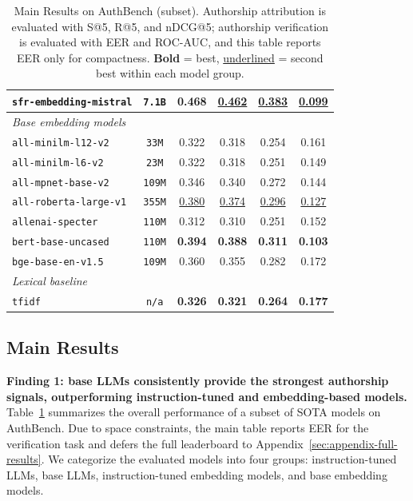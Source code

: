 \documentclass{article}
\newcommand{\rev}[1]{#1}
\begin{document}
\begin{table}[h!]
{\begin{tabular}{lccccc}
\texttt{sfr-embedding-mistral} & \texttt{7.1B} & 0.468 & \underline{0.462} & \underline{0.383} & \underline{0.099} \\
\midrule
\multicolumn{6}{l}{\textit{Base embedding models}} \\
\midrule
\texttt{all-minilm-l12-v2} & \texttt{33M} & 0.322 & 0.318 & 0.254 & 0.161 \\
\texttt{all-minilm-l6-v2} & \texttt{23M} & 0.322 & 0.318 & 0.251 & 0.149 \\
\texttt{all-mpnet-base-v2} & \texttt{109M} & 0.346 & 0.340 & 0.272 & 0.144 \\
\texttt{all-roberta-large-v1} & \texttt{355M} & \underline{0.380} & \underline{0.374} & \underline{0.296} & \underline{0.127} \\
\texttt{allenai-specter} & \texttt{110M} & 0.312 & 0.310 & 0.251 & 0.152 \\
\texttt{bert-base-uncased} & \texttt{110M} & \textbf{0.394} & \textbf{0.388} & \textbf{0.311} & \textbf{0.103} \\
\texttt{bge-base-en-v1.5} & \texttt{109M} & 0.360 & 0.355 & 0.282 & 0.172 \\
\midrule
\multicolumn{6}{l}{\textit{Lexical baseline}} \\
\midrule
\texttt{tfidf} & \texttt{n/a} & \textbf{0.326} & \textbf{0.321} & \textbf{0.264} & \textbf{0.177} \\
\bottomrule
\end{tabular}
}
\caption{Main Results on AuthBench (subset). \rev{Authorship attribution is evaluated with S@5, R@5, and nDCG@5; authorship verification is evaluated with EER and ROC-AUC, and this table reports EER only for compactness.} \textbf{Bold} = best, \underline{underlined} = second best within each model group. }

\label{tab:overall-leaderboard}
\end{table}

\subsection{Main Results}
\label{sec:mainresults}
\textbf{Finding 1: base LLMs consistently provide the strongest authorship signals, outperforming instruction-tuned and embedding-based models.} 
Table~\ref{tab:overall-leaderboard} summarizes the overall performance of a subset of SOTA models on AuthBench. \rev{Due to space constraints, the main table reports EER for the verification task and defers the full leaderboard to Appendix~\ref{sec:appendix-full-results}.} We categorize the evaluated models into four groups: instruction-tuned LLMs, base LLMs, instruction-tuned embedding models, and base embedding models.
\end{document}
